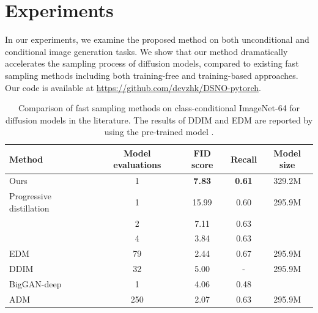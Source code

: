 \section{Experiments}
In our experiments, we examine the proposed method on both unconditional and conditional image generation tasks.
We show that our method dramatically accelerates the sampling process of diffusion models, compared to existing fast sampling methods including both training-free and training-based approaches. Our code is available at \href{https://github.com/devzhk/DSNO-pytorch}{https://github.com/devzhk/DSNO-pytorch}. 

\begin{table}[t]
\caption{Comparison of fast sampling methods on class-conditional ImageNet-64 for diffusion models in the literature. The results of DDIM and EDM are reported by \citet{karras2022elucidating} using the pre-trained model \cite{dhariwal2021diffusion}.}
\label{tb:fid_imagenet}
\vskip 0.1in
\begin{center}
\begin{small}
\begin{tabular}{lcccc}
\toprule
Method & Model evaluations & FID score & Recall & Model size\\
\midrule
Ours    & 1 &  \textbf{7.83} & \textbf{0.61} & 329.2M\\
\midrule
Progressive distillation~\cite{salimans2021progressive}    & 1 & 15.99 & 0.60 &  295.9M\\
        & 2 & 7.11 & 0.63 & \\
        & 4 & 3.84 &  0.63 & \\ 
\midrule
EDM~\cite{karras2022elucidating}                   &  79                 & 2.44  & 0.67   &  295.9M\\
\midrule
DDIM~\cite{song2020denoising}   & 32                & 5.00   & -  & 295.9M \\
\midrule
BigGAN-deep~\cite{brock2018large} & 1 & 4.06 & 0.48 & \\
ADM~\cite{dhariwal2021diffusion} & 250 & 2.07 & 0.63 & 295.9M \\ 
\bottomrule
\end{tabular}
\end{small}
\end{center}
\vskip -0.1in
\end{table}



